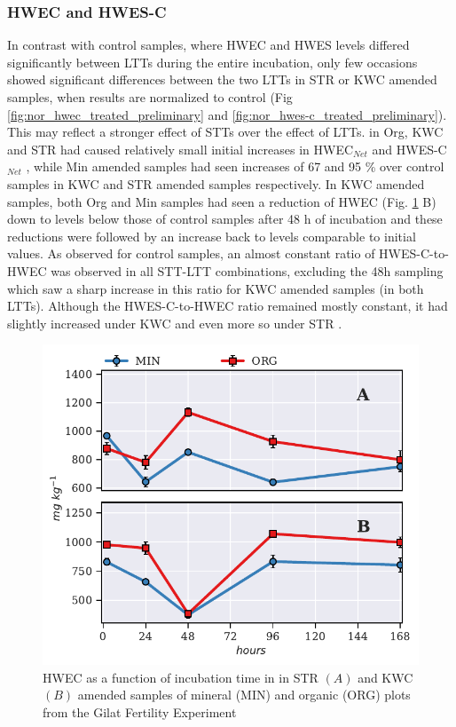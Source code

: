 		\subsubsection{HWEC and HWES-C}
			In contrast with control samples, where HWEC and HWES levels differed significantly between LTTs during the entire incubation, only few occasions showed significant differences between the two LTTs in STR or KWC amended samples, when results are normalized to control (Fig \ref{fig:nor_hwec_treated_preliminary} and \ref{fig:nor_hwes-c_treated_preliminary}). This may reflect a stronger effect of STTs over the effect of LTTs.
			in Org, KWC and STR had caused relatively small initial increases in HWEC$_{Net}$ and HWES-C$_{Net}$  , while Min amended samples had seen increases of 67 and 95 \% over control samples in KWC and STR amended samples respectively. In KWC amended samples, both Org and Min samples  had seen a reduction of HWEC (Fig. \ref{fig:hwec_treated_preliminary} B) down to levels below those of control samples after 48 h of incubation and these reductions were followed by an increase back to levels comparable to initial values.
			As observed for control samples, an almost constant ratio of HWES-C-to-HWEC was observed in all STT-LTT combinations, excluding the 48h sampling which saw a sharp increase in this ratio for KWC amended samples (in both LTTs). Although the HWES-C-to-HWEC ratio remained mostly constant, it had slightly increased under KWC and even more so under STR .

			\begin{figure}[H]
				\centering
				\includegraphics[width=\linewidth]{thesis_figures/preliminary/treated/HWEC.pdf}
				\caption{HWEC  as a function of incubation time in in STR $\left(A\right)$ and KWC $\left(B\right)$ amended samples of mineral (MIN) and organic (ORG) plots from the Gilat Fertility Experiment}
				\label{fig:hwec_treated_preliminary}
			\end{figure}

